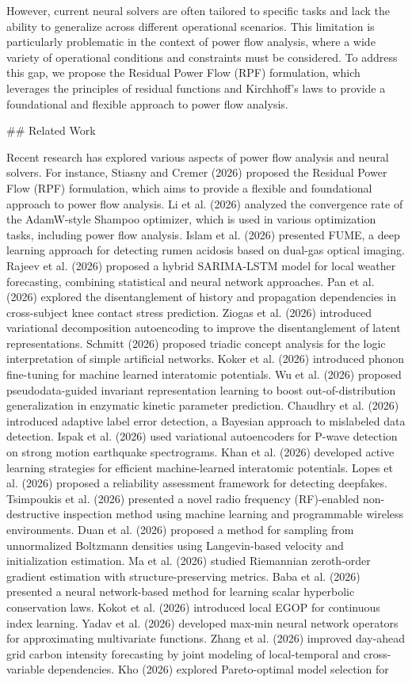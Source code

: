 However, current neural solvers are often tailored to specific tasks and lack the ability to generalize across different operational scenarios. This limitation is particularly problematic in the context of power flow analysis, where a wide variety of operational conditions and constraints must be considered. To address this gap, we propose the Residual Power Flow (RPF) formulation, which leverages the principles of residual functions and Kirchhoff's laws to provide a foundational and flexible approach to power flow analysis.

## Related Work

Recent research has explored various aspects of power flow analysis and neural solvers. For instance, Stiasny and Cremer (2026) proposed the Residual Power Flow (RPF) formulation, which aims to provide a flexible and foundational approach to power flow analysis. Li et al. (2026) analyzed the convergence rate of the AdamW-style Shampoo optimizer, which is used in various optimization tasks, including power flow analysis. Islam et al. (2026) presented FUME, a deep learning approach for detecting rumen acidosis based on dual-gas optical imaging. Rajeev et al. (2026) proposed a hybrid SARIMA-LSTM model for local weather forecasting, combining statistical and neural network approaches. Pan et al. (2026) explored the disentanglement of history and propagation dependencies in cross-subject knee contact stress prediction. Ziogas et al. (2026) introduced variational decomposition autoencoding to improve the disentanglement of latent representations. Schmitt (2026) proposed triadic concept analysis for the logic interpretation of simple artificial networks. Koker et al. (2026) introduced phonon fine-tuning for machine learned interatomic potentials. Wu et al. (2026) proposed pseudodata-guided invariant representation learning to boost out-of-distribution generalization in enzymatic kinetic parameter prediction. Chaudhry et al. (2026) introduced adaptive label error detection, a Bayesian approach to mislabeled data detection. Ispak et al. (2026) used variational autoencoders for P-wave detection on strong motion earthquake spectrograms. Khan et al. (2026) developed active learning strategies for efficient machine-learned interatomic potentials. Lopes et al. (2026) proposed a reliability assessment framework for detecting deepfakes. Tsimpoukis et al. (2026) presented a novel radio frequency (RF)-enabled non-destructive inspection method using machine learning and programmable wireless environments. Duan et al. (2026) proposed a method for sampling from unnormalized Boltzmann densities using Langevin-based velocity and initialization estimation. Ma et al. (2026) studied Riemannian zeroth-order gradient estimation with structure-preserving metrics. Baba et al. (2026) presented a neural network-based method for learning scalar hyperbolic conservation laws. Kokot et al. (2026) introduced local EGOP for continuous index learning. Yadav et al. (2026) developed max-min neural network operators for approximating multivariate functions. Zhang et al. (2026) improved day-ahead grid carbon intensity forecasting by joint modeling of local-temporal and cross-variable dependencies. Kho (2026) explored Pareto-optimal model selection for 